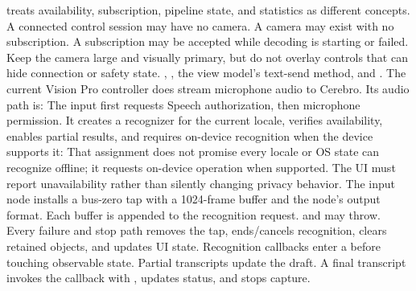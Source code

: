 {} treats availability, subscription, pipeline state, and statistics as different concepts. A connected control session may have no camera. A camera may exist with no subscription. A subscription may be accepted while decoding is starting or failed.\markdownRendererParagraphSeparator
{}Keep the camera large and visually primary, but do not overlay controls that can hide connection or safety state.\markdownRendererInterblockSeparator
{}
\markdownRendererSectionEnd \markdownRendererSectionBegin
{}\markdownRendererInterblockSeparator
{}\markdownRendererBlockQuoteBegin
{} , , the view model's text-send method, and .\markdownRendererBlockQuoteEnd \markdownRendererInterblockSeparator
{}The current Vision Pro controller does  stream microphone audio to Cerebro. Its audio path is:\markdownRendererInterblockSeparator
{}\markdownRendererInterblockSeparator
{}The input first requests Speech authorization, then microphone permission. It creates a recognizer for the current locale, verifies availability, enables partial results, and requires on-device recognition when the device supports it:\markdownRendererInterblockSeparator
{}\markdownRendererInterblockSeparator
{}That assignment does not promise every locale or OS state can recognize offline; it requests on-device operation when supported. The UI must report unavailability rather than silently changing privacy behavior.\markdownRendererParagraphSeparator
{}The  input node installs a bus-zero tap with a 1024-frame buffer and the node's output format. Each buffer is appended to the recognition request.  and  may throw. Every failure and stop path removes the tap, ends/cancels recognition, clears retained objects, and updates UI state.\markdownRendererParagraphSeparator
{}Recognition callbacks enter a  before touching observable state. Partial transcripts update the draft. A final transcript invokes the callback with , updates status, and stops capture.\markdownRendererInterblockSeparator
